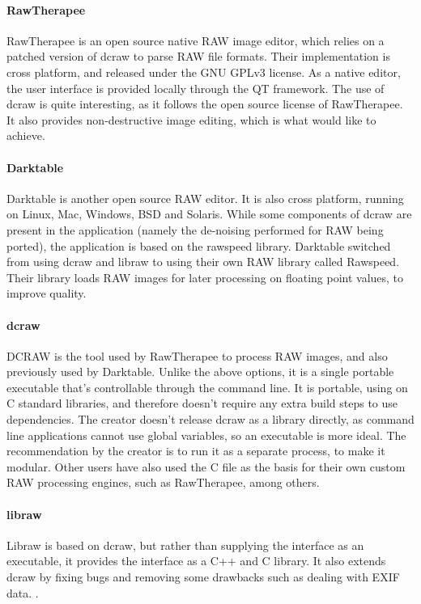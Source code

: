 \documentclass[10pt,a4paper]{article}
\begin{document}
    \paragraph{RawTherapee}
    RawTherapee is an open source native RAW image editor, which relies on a patched version of dcraw to parse RAW file formats.
    Their implementation is cross platform, and released under the GNU GPLv3 license. As a native editor, the user interface is provided
    locally through the QT framework. The use of dcraw is quite interesting, as it follows the open source license of RawTherapee. \cite{RawTherapeeReadme}
    It also provides non-destructive image editing, which is what  would like to achieve.
    \paragraph{Darktable}
    Darktable is another open source RAW editor. It is also cross platform, running on Linux, Mac, Windows, BSD and Solaris. While some components
    of dcraw are present in the application (namely the de-noising performed for RAW being ported), the application is based on the rawspeed library.
    Darktable switched from using dcraw and libraw to using their own RAW library called Rawspeed. Their library loads RAW images for later
    processing on floating point values, to improve quality.  \cite{DarkTableAbout}

    \paragraph{dcraw}
    DCRAW is the tool used by RawTherapee to process RAW images, and also previously used by Darktable. Unlike the above options, it is a single portable
    executable that's controllable through the command line. It is portable, using on C standard libraries, and therefore doesn't require any extra build steps
    to use dependencies. The creator doesn't release dcraw as a library directly, as command line applications cannot use global variables, so an executable is
    more ideal. The recommendation by the creator is to run it as a separate process, to make it modular. Other users have also used the C file
    as the basis for their own custom RAW processing engines, such as RawTherapee, among others. \cite{DCRAWSource}

    \paragraph{libraw}
    Libraw is based on dcraw, but rather than supplying the interface as an executable, it provides the interface as a C++ and C library.
    It also extends dcraw by fixing bugs and removing some drawbacks such as dealing with EXIF data. \cite{LibrawSource}.
\end{document}

